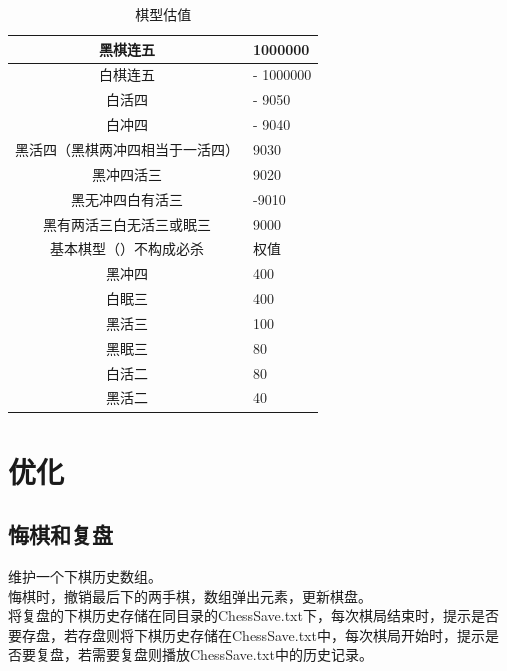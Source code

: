 \documentclass{acm_proc_article-sp}
\begin{document}
\begin{table}
	\centering
	\caption{棋型估值}
	\begin{tabular}{|c|l|} \hline
	黑棋连五 & 1000000 \\ \hline
	 白棋连五 &- 1000000 \\ \hline
	 白活四 &- 9050 \\ \hline
	 白冲四 &- 9040 \\ \hline
	 黑活四（黑棋两冲四相当于一活四） &9030 \\ \hline
	 黑冲四活三& 9020 \\ \hline
	 黑无冲四白有活三 &-9010\\ \hline
	 
	 黑有两活三白无活三或眠三& 9000 \\ \hline
	基本棋型（）不构成必杀 &  权值\\ \hline
	 黑冲四 &  400\\ \hline
	 白眠三 &  400\\ \hline
	 黑活三 &  100\\ \hline
     黑眠三 &  80\\ \hline
     白活二    &  80\\ \hline
     黑活二     &  40\\ \hline
	\end{tabular}
\end{table}
\section{优化}
\subsection{悔棋和复盘}
维护一个下棋历史数组。\\
悔棋时，撤销最后下的两手棋，数组弹出元素，更新棋盘。\\
将复盘的下棋历史存储在同目录的ChessSave.txt下，每次棋局结束时，提示是否要存盘，若存盘则将下棋历史存储在ChessSave.txt中，每次棋局开始时，提示是否要复盘，若需要复盘则播放ChessSave.txt中的历史记录。\\
\end{document}
